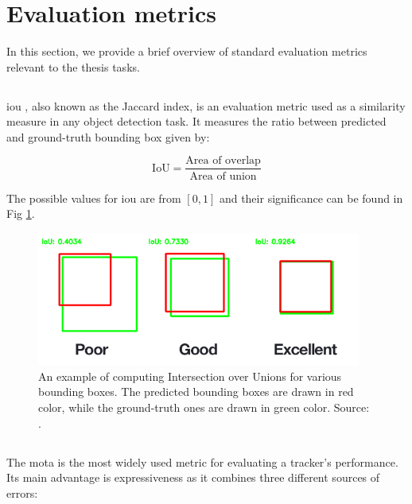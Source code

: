 \section{Evaluation metrics} \label{evaluation-metrics}
    In this section, we provide a brief overview of standard evaluation metrics relevant to the thesis tasks.
    
    \subsection{}
        \Gls{iou} \cite{hamers1989similarity}, also known as the Jaccard index, is an evaluation metric used as a similarity measure in any object detection task. It measures the ratio between predicted and ground-truth bounding box given by:
        
        \begin{equation}
            \text{IoU} = \frac{\text{Area of overlap}}{\text{Area of union}} 
        \end{equation}
        
        The possible values for \gls{iou} are from $[0, 1]$ and their significance can be found in Fig \ref{fig:iou-examples}.

        \begin{figure}[ht]
            \centering
            \includegraphics[width=0.95\textwidth]{resources/iou_examples.png}
            \caption{An example of computing Intersection over Unions for various bounding boxes. The predicted bounding boxes are drawn in red color, while the ground-truth ones are drawn in green color. Source: \cite{iourosebrock}.}
            \label{fig:iou-examples}
        \end{figure}
        
    \subsection{}
        The \gls{mota} \cite{MOTChallenge2015} is the most widely used metric for evaluating a tracker's performance. Its main advantage is expressiveness as it combines three different sources of errors:
        
